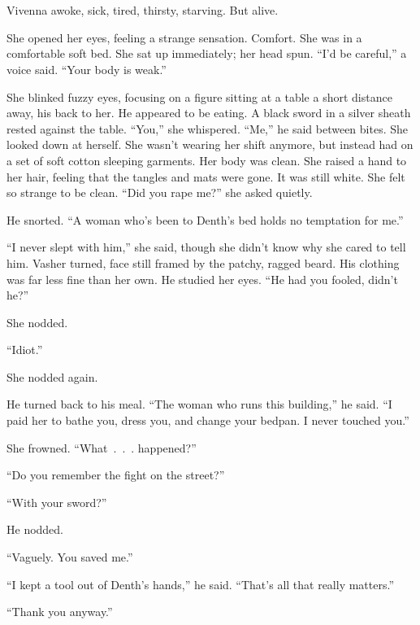 \chapter{}

Vivenna awoke, sick, tired, thirsty, starving. But alive.

She opened her eyes, feeling a strange sensation. Comfort. She was in a comfortable soft bed. She sat up immediately; her head spun. “I’d be careful,” a voice said. “Your body is weak.”

She blinked fuzzy eyes, focusing on a figure sitting at a table a short distance away, his back to her. He appeared to be eating. A black sword in a silver sheath rested against the table. “You,” she whispered. “Me,” he said between bites. She looked down at herself. She wasn’t wearing her shift anymore, but instead had on a set of soft cotton sleeping garments. Her body was clean. She raised a hand to her hair, feeling that the tangles and mats were gone. It was still white. She felt so strange to be clean. “Did you rape me?” she asked quietly.

He snorted. “A woman who’s been to Denth’s bed holds no temptation for me.”

“I never slept with him,” she said, though she didn’t know why she cared to tell him. Vasher turned, face still framed by the patchy, ragged beard. His clothing was far less fine than her own. He studied her eyes. “He had you fooled, didn’t he?”

She nodded.

“Idiot.”

She nodded again.

He turned back to his meal. “The woman who runs this building,” he said. “I paid her to bathe you, dress you, and change your bedpan. I never touched you.”

She frowned. “What~.~.~. happened?”

“Do you remember the fight on the street?”

“With your sword?”

He nodded.

“Vaguely. You saved me.”

“I kept a tool out of Denth’s hands,” he said. “That’s all that really matters.”

“Thank you anyway.”

